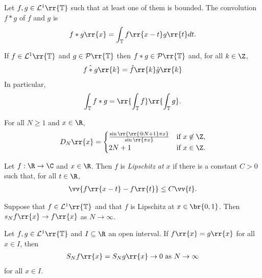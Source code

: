 \documentclass{article}
\begin{document}
\begin{definition}
  Let $f,g\in\mathcal L^1\rr{\mathbb T}$ such that at least one of them is bounded. The
  convolution $f * g$ of $f$ and $g$ is
  \begin{align*}
    f*g\rr{x}=\int_{\mathbb T} f\rr{x-t}g\rr{t}dt.
  \end{align*}
\end{definition}

\begin{proposition}
  If $f\in\mathcal L^1\rr{\mathbb T}$ and $g\in\mathcal P\rr{\mathbb T}$ then
  $f*g\in\mathcal P\rr{\mathbb T}$ and, for all $k\in\Z$,
  \begin{align*}
    \hat{f*g}\rr{k}=\hat f\rr{k}\hat g\rr{k}
  \end{align*}
  In particular,
  \begin{align*}
    \int_{\mathbb T} f * g = \rr{\int_{\mathbb T} f}\rr{\int_{\mathbb T} g}.
  \end{align*}
\end{proposition}

\begin{lemma}
  For all $N\geq 1$ and $x\in\R$,
  \begin{align*}
    D_N\rr{x} =
    \begin{cases}
      \frac{\sin\rr{\rr{@N+1}\pi x}}{\sin\rr{\pi x}} & \text{if }x\not\in\Z,\\
      2N+1 &\text{if }x\in\Z.
    \end{cases}
  \end{align*}
\end{lemma}

\begin{definition}
  Let $f:\R\to\C$ and $x\in\R$. Then $f$ is \emph{Lipschitz at $x$} if there is a
  constant $C>0$ such that, for all $t\in\R$,
  \begin{align*}
    \vv{f\rr{x-t}-f\rr{t}}\leq C\vv{t}.
  \end{align*}
\end{definition}

\begin{theorem}
  Suppose that $f\in\mathcal L^1\rr{\mathbb T}$ and that $f$ is Lipschitz at $x\in\br{0,1}$.
  Then $s_N f\rr{x}\to f\rr{x}$ as $N\to\infty$.
\end{theorem}

\begin{theorem}
  Let $f,g\in\mathcal L^1\rr{\mathbb T}$ and $I\subseteq\R$ an open interval.
  If $f\rr{x}=g\rr{x}$ for all $x\in I$, then
  \begin{align*}
    S_N f\rr{x}=S_N g\rr{x}\to 0 \text{ as } N\to\infty
  \end{align*}
  for all $x\in I$.
\end{theorem}
\end{document}
